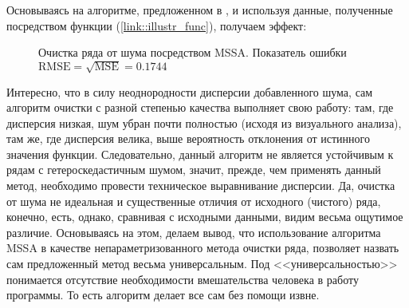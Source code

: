  \label{link::mssa}
\\\\
Основываясь на алгоритме, предложенном в \cite{kuang2020efficient}, и используя данные, полученные посредством функции (\ref{link::illustr_func}), получаем эффект:
\begin{figure}[H]
	\centering
	\caption{Очистка ряда от шума посредством MSSA. Показатель ошибки $\text{RMSE} = \sqrt{\text{MSE}} = 0.1744$}
\end{figure}
\noindent Интересно, что в силу неоднородности дисперсии добавленного шума, сам алгоритм очистки с разной степенью качества выполняет свою работу: там, где дисперсия низкая, шум убран почти полностью (исходя из визуального анализа), там же, где дисперсия велика, выше вероятность отклонения от истинного значения функции. Следовательно, данный алгоритм не является устойчивым к рядам с гетероскедастичным шумом, значит, прежде, чем применять данный метод, необходимо провести техническое выравнивание дисперсии. Да, очистка от шума не идеальная и существенные отличия от исходного (чистого) ряда, конечно, есть, однако, сравнивая с исходными данными, видим весьма ощутимое различие. Основываясь на этом, делаем вывод, что использование алгоритма MSSA в качестве непараметризованного метода очистки ряда, позволяет назвать сам предложенный метод весьма универсальным. Под <<универсальностью>> понимается отсутствие необходимости вмешательства человека в работу программы. То есть алгоритм делает все сам без помощи извне. 

